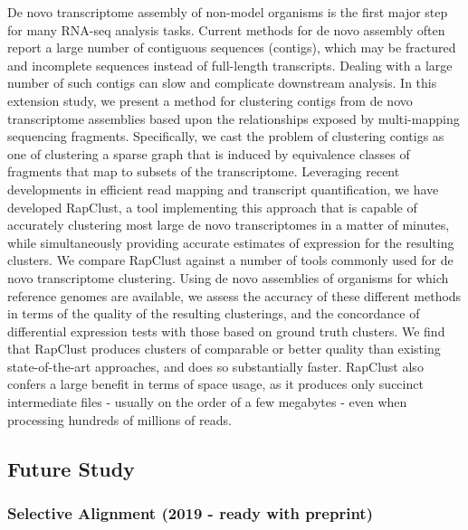De novo transcriptome assembly of non-model organisms is the first major step for many 
RNA-seq analysis tasks. Current methods for de novo assembly often report a large number 
of contiguous sequences (contigs), which may be fractured and incomplete sequences 
instead of full-length transcripts. Dealing with a large number of such contigs can 
slow and complicate downstream analysis. In this extension study, we present a method 
for clustering contigs from de novo transcriptome assemblies based upon the relationships 
exposed by multi-mapping sequencing fragments. Specifically, we cast the problem of 
clustering contigs as one of clustering a sparse graph that is induced by equivalence 
classes of fragments that map to subsets of the transcriptome. Leveraging recent developments 
in efficient read mapping and transcript quantification, we have developed RapClust, a tool 
implementing this approach that is capable of accurately clustering most large de novo 
transcriptomes in a matter of minutes, while simultaneously providing accurate estimates of 
expression for the resulting clusters. We compare RapClust against a number of tools commonly 
used for de novo transcriptome clustering. Using de novo assemblies of organisms for which 
reference genomes are available, we assess the accuracy of these different methods in terms of 
the quality of the resulting clusterings, and the concordance of differential expression tests 
with those based on ground truth clusters. We find that RapClust produces clusters of comparable 
or better quality than existing state-of-the-art approaches, and does so substantially faster. 
RapClust also confers a large benefit in terms of space usage, as it produces only succinct 
intermediate files - usually on the order of a few megabytes - even when processing hundreds 
of millions of reads.

\subsection{Future Study}
\subsubsection{Selective Alignment (2019 - ready with preprint)}

